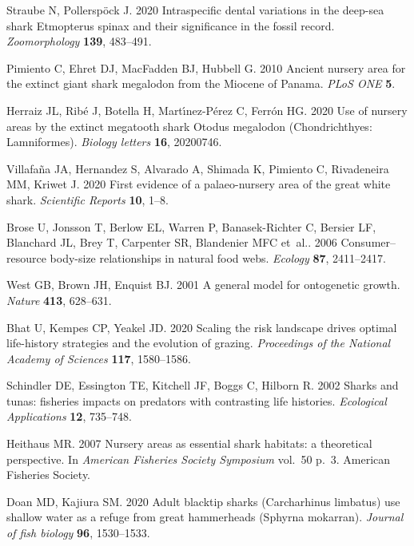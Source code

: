 \documentclass[]{rsos}%
\begin{document}
\begin{thebibliography}{99}
Straube N, Pollersp{\"o}ck J. 2020  Intraspecific dental variations in the
  deep-sea shark Etmopterus spinax and their significance in the fossil record.
  {\em Zoomorphology} \textbf{139}, 483--491.

Pimiento C, Ehret DJ, MacFadden BJ, Hubbell G. 2010  {Ancient nursery area for
  the extinct giant shark megalodon from the Miocene of Panama}. {\em PLoS ONE}
  \textbf{5}.

Herraiz JL, Rib{\'e} J, Botella H, Mart{\'\i}nez-P{\'e}rez C, Ferr{\'o}n HG.
  2020  Use of nursery areas by the extinct megatooth shark Otodus megalodon
  (Chondrichthyes: Lamniformes). {\em Biology letters} \textbf{16}, 20200746.

Villafa{\~{n}}a JA, Hernandez S, Alvarado A, Shimada K, Pimiento C, Rivadeneira
  MM, Kriwet J. 2020  {First evidence of a palaeo-nursery area of the great
  white shark}. {\em Scientific Reports} \textbf{10}, 1--8.

Brose U, Jonsson T, Berlow EL, Warren P, Banasek-Richter C, Bersier LF,
  Blanchard JL, Brey T, Carpenter SR, Blandenier MFC et~al.. 2006
  Consumer--resource body-size relationships in natural food webs. {\em
  Ecology} \textbf{87}, 2411--2417.

West GB, Brown JH, Enquist BJ. 2001  {A general model for ontogenetic growth}.
  {\em Nature} \textbf{413}, 628--631.

Bhat U, Kempes CP, Yeakel JD. 2020  Scaling the risk landscape drives optimal
  life-history strategies and the evolution of grazing. {\em Proceedings of the
  National Academy of Sciences} \textbf{117}, 1580--1586.

Schindler DE, Essington TE, Kitchell JF, Boggs C, Hilborn R. 2002  Sharks and
  tunas: fisheries impacts on predators with contrasting life histories. {\em
  Ecological Applications} \textbf{12}, 735--748.

Heithaus MR. 2007  Nursery areas as essential shark habitats: a theoretical
  perspective. In {\em American Fisheries Society Symposium} vol.~50 p.~3.
  American Fisheries Society.

Doan MD, Kajiura SM. 2020  Adult blacktip sharks (Carcharhinus limbatus) use
  shallow water as a refuge from great hammerheads (Sphyrna mokarran). {\em
  Journal of fish biology} \textbf{96}, 1530--1533.


\end{thebibliography}
\end{document}
